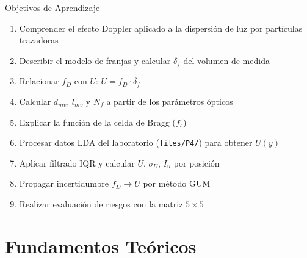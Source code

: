 \documentclass[aspectratio=169,12pt]{beamer}
\begin{document}
\begin{frame}{Objetivos de Aprendizaje}
	\begin{enumerate}
		\item Comprender el efecto Doppler aplicado a la dispersión de
		      luz por partículas trazadoras
		\item Describir el modelo de franjas y calcular $\delta_f$
		      del volumen de medida
		\item Relacionar $f_D$ con $U$: $U = f_D \cdot \delta_f$
		\item Calcular $d_{mv}$, $l_{mv}$ y $N_f$ a partir
		      de los parámetros ópticos
		\item Explicar la función de la celda de Bragg ($f_s$)
		\item Procesar datos LDA del laboratorio (\texttt{files/P4/})
		      para obtener $U(y)$
		\item Aplicar filtrado IQR y calcular $\bar{U}$, $\sigma_U$,
		      $I_u$ por posición
		\item Propagar incertidumbre $f_D \to U$ por método GUM
		\item Realizar evaluación de riesgos con la matriz $5\times5$
	\end{enumerate}
\end{frame}

\section{Fundamentos Teóricos}
\end{document}
